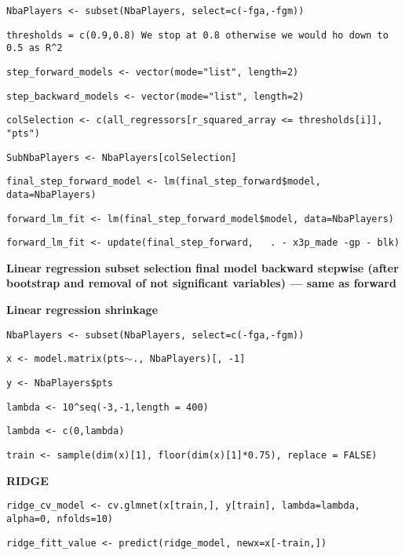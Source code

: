 \begin{center}
\texttt{NbaPlayers <- subset(NbaPlayers, select=c(-fga,-fgm))}

\texttt{thresholds = c(0.9,0.8) We stop at 0.8 otherwise we would ho down to 0.5 as R\^{}2}

\texttt{step\_forward\_models <- vector(mode="list", length=2)}

\texttt{step\_backward\_models <- vector(mode="list", length=2)}

\texttt{colSelection <- c(all\_regressors[r\_squared\_array <= thresholds[i]], "pts")}

\texttt{SubNbaPlayers <- NbaPlayers[colSelection]}



\texttt{final\_step\_forward\_model <- lm(final\_step\_forward\$model, data=NbaPlayers)}

\texttt{forward\_lm\_fit <- lm(final\_step\_forward\_model\$model, data=NbaPlayers)}

\texttt{forward\_lm\_fit <- update(final\_step\_forward, ~ . - x3p\_made -gp - blk)}

\end{center}
	
\noindent
\textbf{Linear regression subset selection final model backward stepwise (after bootstrap and removal of not significant variables) --- same as forward}

\noindent
\textbf{Linear regression shrinkage}

\begin{center}
\texttt{NbaPlayers <- subset(NbaPlayers, select=c(-fga,-fgm))}

\texttt{x <- model.matrix(pts$\sim$., NbaPlayers)[, -1]}

\texttt{y <- NbaPlayers\$pts}

\texttt{lambda <- 10\^{}seq(-3,-1,length = 400)}

\texttt{lambda <- c(0,lambda)}

\texttt{train <- sample(dim(x)[1], floor(dim(x)[1]*0.75), replace = FALSE)}
\end{center}
	
\textbf{RIDGE}

\begin{center}
\texttt{ridge\_cv\_model <- cv.glmnet(x[train,], y[train], lambda=lambda, alpha=0, nfolds=10)}


\texttt{ridge\_fitt\_value <- predict(ridge\_model, newx=x[-train,])}
\end{center}
	
